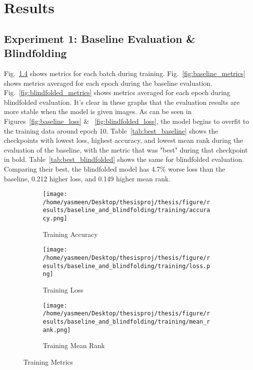 \chapter{Results}
\section{Experiment 1: Baseline Evaluation \& Blindfolding}
Fig.~\ref{fig:training_metrics} shows metrics for each batch during training. Fig.~\ref{fig:baseline_metrics} shows metrics averaged for each epoch during the baseline evaluation. Fig.~\ref{fig:blindfolded_metrics} shows metrics averaged for each epoch during blindfolded evaluation. It's clear in these graphs that the evaluation results are more stable when the model is given images. As can be seen in Figures~\ref{fig:baseline_loss} \& ~\ref{fig:blindfolded_loss}, the model begins to overfit to the training data around epoch 10. 
Table~\ref{tab:best_baseline} shows the checkpoints with lowest loss, highest accuracy, and lowest mean rank during the evaluation of the baseline, with the metric that was "best" during that checkpoint in bold. Table~\ref{tab:best_blindfolded} shows the same for blindfolded evaluation. Comparing their best, the blindfolded model has 4.7\% worse loss than the baseline, 0.212 higher loss, and 0.149 higher mean rank. 

\begin{figure}[ht!]
     \centering
     \begin{subfigure}[b]{0.3\textwidth}
         \centering
         \texttt{[image: /home/yasmeen/Desktop/thesisproj/thesis/figure/results/baseline\_and\_blindfolding/training/accuracy.png]}
         \caption{Training Accuracy}
         \label{fig:training_accuracy}
     \end{subfigure}
     \hfill
     \begin{subfigure}[b]{0.3\textwidth}
         \centering
         \texttt{[image: /home/yasmeen/Desktop/thesisproj/thesis/figure/results/baseline\_and\_blindfolding/training/loss.png]}
         \caption{Training Loss}
         \label{fig:training_loss}
     \end{subfigure}
     \hfill
     \begin{subfigure}[b]{0.3\textwidth}
         \centering
         \texttt{[image: /home/yasmeen/Desktop/thesisproj/thesis/figure/results/baseline\_and\_blindfolding/training/mean\_rank.png]}
         \caption{Training Mean Rank}
         \label{fig:training_mean_rank}
     \end{subfigure}
     \caption{Training Metrics}
     \label{fig:training_metrics}
\end{figure}

